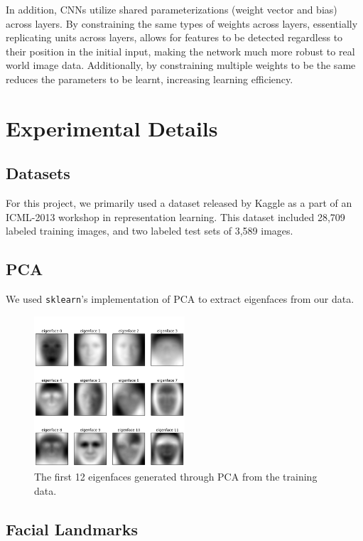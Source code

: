 \documentclass[11pt, twocolumn, twoside]{article}
\begin{document}
In addition, CNNs utilize shared parameterizations (weight vector and bias) across layers. By constraining the same types of weights across layers, essentially replicating units across layers, allows for features to be detected regardless to their position in the initial input, making the network much more robust to real world image data. Additionally, by constraining multiple weights to be the same reduces the parameters to be learnt, increasing learning efficiency.

\section{Experimental Details}

\subsection{Datasets}

For this project, we primarily used a dataset released by Kaggle as a part of an
ICML-2013 workshop in representation learning. This dataset included 28,709 labeled
training images, and two labeled test sets of 3,589 images.

\subsection{PCA}
We used \texttt{sklearn}'s implementation of PCA to extract eigenfaces from our data.

\begin{figure}
\centering
\includegraphics[width=0.5\textwidth]{eigenfaces}
\caption{\label{fig:eigenfaces} The first 12 eigenfaces generated through PCA from the
training data.}
\end{figure}

\subsection{Facial Landmarks}
\end{document}
